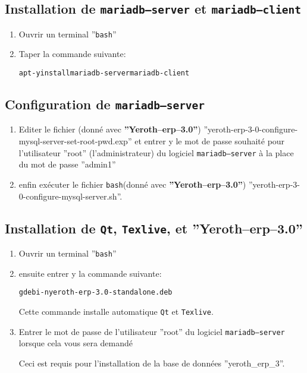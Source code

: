\documentclass[a4paper, 10pt]{article}
\newcommand{\yerotherptroiszero}{\textbf{''Yeroth--erp--3.0''}\xspace}
\newcommand{\texlive}{\texttt{Texlive}\xspace}
\newcommand{\bash}{\texttt{bash}\xspace}
\newcommand{\qt}{\texttt{Qt}\xspace}
\newcommand{\mariadbserver}{\texttt{mariadb--server}\xspace}
\newcommand{\mariadbclient}{\texttt{mariadb--client}\xspace}
\newcommand{\rootcommand}[1]{\textcolor{purplish}{#1\xspace}}
\begin{document}
\subsection{Installation de \mariadbserver et \mariadbclient}

\begin{enumerate}[1)]
	\item Ouvrir un terminal ''\bash''
	\item Taper la commande suivante:
		\begin{alltt}
			\rootcommand{apt -y install mariadb-server mariadb-client}
		\end{alltt}		
\end{enumerate} 

\subsection{Configuration de \mariadbserver}

\begin{enumerate}[1)]
	\item Editer le fichier (donn\'e avec \yerotherptroiszero)
		''yeroth-erp-3-0-configure-mysql-server-set-root-pwd.exp''
		et entrer y le mot de passe souhait\'e pour
		l'utilisateur ''root'' (l'administrateur) du logiciel \mariadbserver
		\`a la place du mot de passe ''admin1''
		
	\item enfin ex\'ecuter le fichier \bash (donn\'e avec \yerotherptroiszero)
		''yeroth-erp-3-0-configure-mysql-server.sh''.	
\end{enumerate}

\subsection{Installation de \qt, \texlive, et \yerotherptroiszero}

\begin{enumerate}[1)]
	\item Ouvrir un terminal ''\bash''
	\item ensuite entrer y la commande suivante:
		\begin{alltt}
			\rootcommand{gdebi -n yeroth-erp-3.0-standalone.deb}
		\end{alltt}
		
		Cette commande installe automatique \qt et \texlive.
		
	\item Entrer le mot de passe de l'utilisateur ''root''
		du logiciel \mariadbserver lorsque cela vous
		sera demand\'e
		
		Ceci est requis pour l'installation de la base
		de donn\'ees ''yeroth\_erp\_3''.
\end{enumerate}
\end{document}
